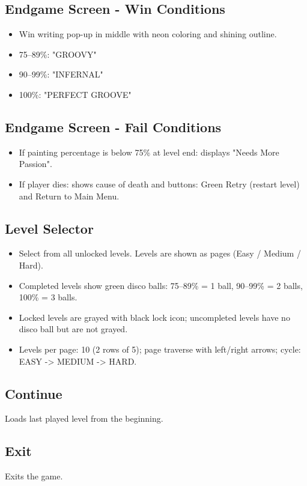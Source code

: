 \documentclass[11pt,a4paper]{report}
\begin{document}
\subsection{Endgame Screen - Win Conditions}
\begin{itemize}
  \item Win writing pop-up in middle with neon coloring and shining outline.
  \item 75--89\%: "GROOVY"
  \item 90--99\%: "INFERNAL"
  \item 100\%: "PERFECT GROOVE"
\end{itemize}

\subsection{Endgame Screen - Fail Conditions}
\begin{itemize}
  \item If painting percentage is below 75\% at level end: displays "Needs More Passion".
  \item If player dies: shows cause of death and buttons: Green Retry (restart level) and Return to Main Menu.
\end{itemize}

\subsection{Level Selector}
\begin{itemize}
  \item Select from all unlocked levels. Levels are shown as pages (Easy / Medium / Hard).
  \item Completed levels show green disco balls: 75--89\% = 1 ball, 90--99\% = 2 balls, 100\% = 3 balls.
  \item Locked levels are grayed with black lock icon; uncompleted levels have no disco ball but are not grayed.
  \item Levels per page: 10 (2 rows of 5); page traverse with left/right arrows; cycle: EASY -> MEDIUM -> HARD.
\end{itemize}

\subsection{Continue}
Loads last played level from the beginning.

\subsection{Exit}
Exits the game.
\end{document}
